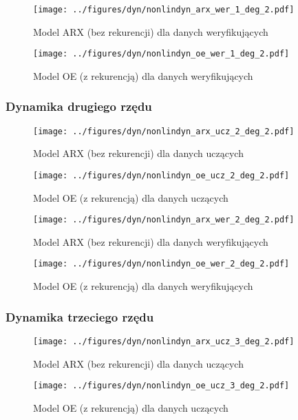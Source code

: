 \documentclass[a4paper,titlepage,11pt,floatssmall]{mwrep}
\begin{document}
\begin{figure}[H]
\centering
\texttt{[image: ../figures/dyn/nonlindyn\_arx\_wer\_1\_deg\_2.pdf]}
\caption{Model ARX (bez rekurencji) dla danych weryfikujących}
\end{figure}

\begin{figure}[H]
\centering
\texttt{[image: ../figures/dyn/nonlindyn\_oe\_wer\_1\_deg\_2.pdf]}
\caption{Model OE (z rekurencją) dla danych weryfikujących}
\end{figure}

\subsubsection{Dynamika drugiego rzędu}
\begin{figure}[H]
\centering
\texttt{[image: ../figures/dyn/nonlindyn\_arx\_ucz\_2\_deg\_2.pdf]}
\caption{Model ARX (bez rekurencji) dla danych uczących}
\end{figure}

\begin{figure}[H]
\centering
\texttt{[image: ../figures/dyn/nonlindyn\_oe\_ucz\_2\_deg\_2.pdf]}
\caption{Model OE (z rekurencją) dla danych uczących}
\end{figure}

\begin{figure}[H]
\centering
\texttt{[image: ../figures/dyn/nonlindyn\_arx\_wer\_2\_deg\_2.pdf]}
\caption{Model ARX (bez rekurencji) dla danych weryfikujących}
\end{figure}

\begin{figure}[H]
\centering
\texttt{[image: ../figures/dyn/nonlindyn\_oe\_wer\_2\_deg\_2.pdf]}
\caption{Model OE (z rekurencją) dla danych weryfikujących}
\end{figure}

\subsubsection{Dynamika trzeciego rzędu}
\begin{figure}[H]
\centering
\texttt{[image: ../figures/dyn/nonlindyn\_arx\_ucz\_3\_deg\_2.pdf]}
\caption{Model ARX (bez rekurencji) dla danych uczących}
\end{figure}

\begin{figure}[H]
\centering
\texttt{[image: ../figures/dyn/nonlindyn\_oe\_ucz\_3\_deg\_2.pdf]}
\caption{Model OE (z rekurencją) dla danych uczących}
\end{figure}
\end{document}

